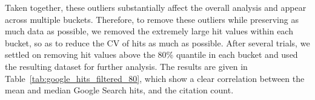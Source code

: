 \documentclass[11pt]{article}
\begin{document}
Taken together, these outliers substantially affect the overall analysis and appear across multiple buckets. Therefore, to remove these outliers while preserving as much data as possible, we removed the extremely large hit values within each bucket, so as to reduce the CV of hits as much as possible. After several trials, we settled on removing hit values above the 80\% quantile in each bucket and used the resulting dataset for further analysis. The results are given in Table~\ref{tab:google_hits_filtered_80}, which show a clear correlation between the mean and median Google Search hits, and the citation count.

\begin{table}[h!]
\setlength{\tabcolsep}{1pt}
\centering

%
\caption{Google search hits vs citation buckets (N = 4,185).}
\label{tab:google_hits_filtered_80}
\end{table}
\end{document}
